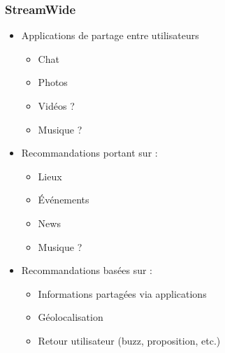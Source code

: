 \documentclass[11pt,sans]{beamer}
\begin{document}
\begin{frame}
        \frametitle{StreamWide}

        \begin{itemize}
            \item Applications de partage entre utilisateurs
                \begin{itemize}
                    \item Chat
                    \item Photos
                    \item Vid\'eos ?
                    \item Musique ?
                \end{itemize}
            \item Recommandations portant sur :
                \begin{itemize}
                    \item Lieux
                    \item \'Ev\'enements
                    \item News
                    \item Musique ?
                \end{itemize}
            \item Recommandations bas\'ees sur :
                \begin{itemize}
                    \item Informations partag\'ees via applications
                    \item G\'eolocalisation
                    \item Retour utilisateur (buzz, proposition, etc.)
                \end{itemize}
        \end{itemize}
    \end{frame}
\end{document}
